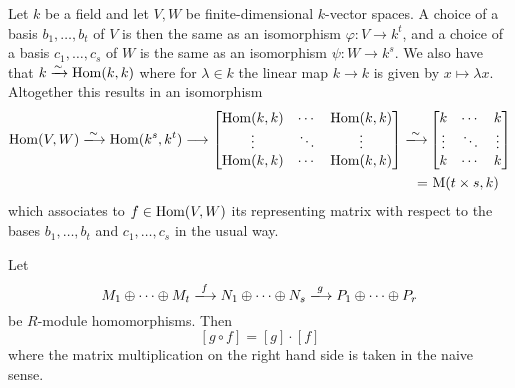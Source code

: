 \begin{example}
  Let $k$ be a field and let $V, W$ be finite-dimensional $k$-vector spaces.
  A choice of a basis $b_1, \dotsc, b_t$ of $V$ is then the same as an isomorphism $\varphi \colon V \to k^t$, and a choice of a basis $c_1, \dotsc, c_s$ of $W$ is the same as an isomorphism $\psi \colon W \to k^s$.
  We also have that $k \xrightarrow{\sim} \operatorname{Hom}(k,k)$ where for $\lambda \in k$ the linear map $k \to k$ is given by $x \mapsto \lambda x$.
  Altogether this results in an isomorphism
  \begin{align*}
      \Hom(V,W)
    \xlongrightarrow{\sim}
      \Hom(k^s, k^t)
    \longto
      \begin{bmatrix}
        \Hom(k,k) & \cdots  & \Hom(k,k) \\
        \vdots    & \ddots  & \vdots    \\
        \Hom(k,k) & \cdots  & \Hom(k,k)
      \end{bmatrix}
    \xlongrightarrow{\sim}&
      \begin{bmatrix}
        k       & \cdots  & k       \\
        \vdots  & \ddots  & \vdots  \\
        k       & \cdots  & k
      \end{bmatrix}
    \\
    =&\,
      \Mat(t \times s, k)
  \end{align*}
  which associates to $f \in \operatorname{Hom}(V, W)$ its representing matrix with respect to the bases $b_1, \dotsc, b_t$ and $c_1, \dotsc, c_s$ in the usual way.
\end{example}


\begin{proposition}
  \label{proposition: representing matrix is multiplicative}
  Let
  \[
    M_1 \oplus \dotsb \oplus M_t
    \xlongrightarrow{f}
    N_1 \oplus \dotsb \oplus N_s
    \xlongrightarrow{g}
    P_1 \oplus \dotsb \oplus P_r
  \]
  be $R$-module homomorphisms.
  Then
  \[
      [g \circ f]
    = [g] \cdot [f]
  \]
  where the matrix multiplication on the right hand side is taken in the naive sense.
\end{proposition}


